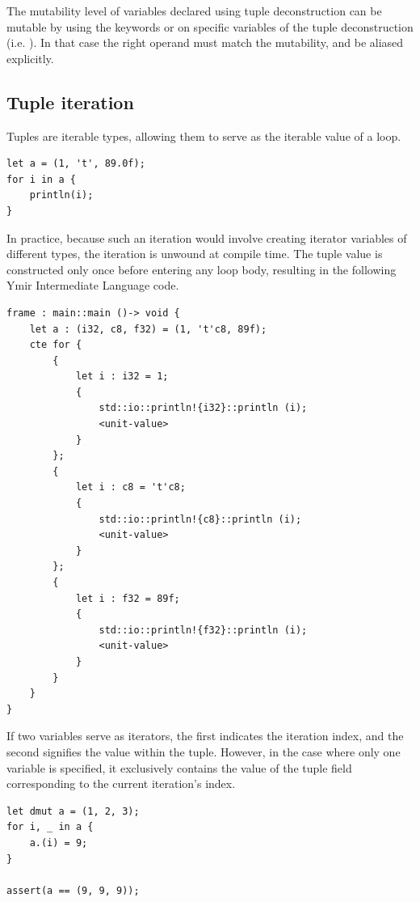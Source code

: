 The mutability level of variables declared using tuple deconstruction can be
mutable by using the keywords  or  on specific
variables of the tuple deconstruction (i.e. ). In that case the right operand must match the mutability, and be aliased
explicitly.

\subsection{Tuple iteration}

Tuples are iterable types, allowing them to serve as the iterable value of a  loop.

\begin{lstlisting}[style=coloredverbatim]
let a = (1, 't', 89.0f);
for i in a {
    println(i);
}
\end{lstlisting}

In practice, because such an iteration would involve creating iterator variables
of different types, the iteration is unwound at compile time. The tuple value is
constructed only once before entering any loop body, resulting in the following
Ymir Intermediate Language code.

\begin{lstlisting}[style=myilVerb]
frame : main::main ()-> void {
    let a : (i32, c8, f32) = (1, 't'c8, 89f);
    cte for {
        {
            let i : i32 = 1;
            {
                std::io::println!{i32}::println (i);
                <unit-value>
            }
        };
        {
            let i : c8 = 't'c8;
            {
                std::io::println!{c8}::println (i);
                <unit-value>
            }
        };
        {
            let i : f32 = 89f;
            {
                std::io::println!{f32}::println (i);
                <unit-value>
            }
        }
    }
}
\end{lstlisting}

If two variables serve as iterators, the first indicates the iteration index,
and the second signifies the value within the tuple. However, in the case where
only one variable is specified, it exclusively contains the value of the tuple
field corresponding to the current iteration's index.

\begin{lstlisting}[style=coloredverbatim]
let dmut a = (1, 2, 3);
for i, _ in a {
    a.(i) = 9;
}

assert(a == (9, 9, 9));
\end{lstlisting}

